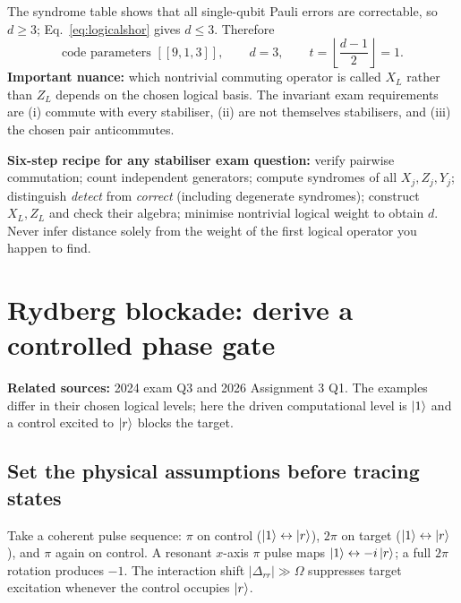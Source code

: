 The syndrome table shows that all single-qubit Pauli errors are correctable, so $d\ge3$; Eq.~\eqref{eq:logicalshor} gives $d\le3$. Therefore
\begin{equation}
\boxed{\text{code parameters }[[9,1,3]],\qquad d=3,\qquad
 t=\left\lfloor\frac{d-1}{2}\right\rfloor=1.}
\end{equation}
\textbf{Important nuance:} which nontrivial commuting operator is called $X_L$ rather than $Z_L$ depends on the chosen logical basis. The invariant exam requirements are (i) commute with every stabiliser, (ii) are not themselves stabilisers, and (iii) the chosen pair anticommutes.

\begin{examtip}
\textbf{Six-step recipe for any stabiliser exam question:} verify pairwise commutation; count independent generators; compute syndromes of all $X_j,Z_j,Y_j$; distinguish \emph{detect} from \emph{correct} (including degenerate syndromes); construct $X_L,Z_L$ and check their algebra; minimise nontrivial logical weight to obtain $d$. Never infer distance solely from the weight of the first logical operator you happen to find.
\end{examtip}

\section{Rydberg blockade: derive a controlled phase gate}\label{sec:rydsol}
\textbf{Related sources:} 2024 exam Q3 and 2026 Assignment 3 Q1. The examples differ in their chosen logical levels; here the driven computational level is $\left\lvert 1\right\rangle$ and a control excited to $\left\lvert r\right\rangle$ blocks the target.

\subsection{Set the physical assumptions before tracing states}
Take a coherent pulse sequence: $\pi$ on control ($\left\lvert 1\right\rangle\leftrightarrow\left\lvert r\right\rangle$), $2\pi$ on target ($\left\lvert 1\right\rangle\leftrightarrow\left\lvert r\right\rangle$), and $\pi$ again on control. A resonant $x$-axis $\pi$ pulse maps $\left\lvert 1\right\rangle\leftrightarrow-i\left\lvert r\right\rangle$; a full $2\pi$ rotation produces $-1$. The interaction shift $|\Delta_{rr}|\gg\Omega$ suppresses target excitation whenever the control occupies $\left\lvert r\right\rangle$.

